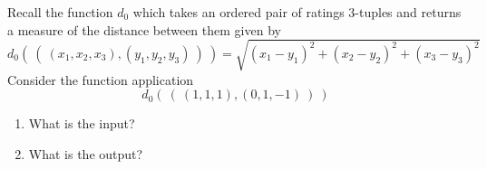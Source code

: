 
Recall the function
$d_0$ which takes an ordered pair of ratings $3$-tuples and returns a measure
of the distance between them 
given by
\[
d_0 (~(~ (x_1, x_2, x_3), (y_1, y_2, y_3) ~) ~) = \sqrt{ (x_1 - y_1)^2 + (x_2 - y_2)^2 + (x_3 -y_3)^2}
\]
Consider the function application 
\[
  d_0 (~( ~(1,1,1), (0, 1, -1)~) ~)
\]
\begin{enumerate}
    \item What is the input? 
    \item What is the output?
\end{enumerate}
